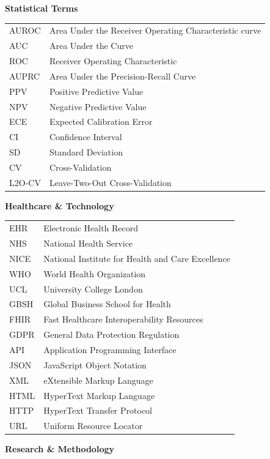 \documentclass[12pt, a4paper]{article}
\begin{document}
\vspace{0.5cm}
\textbf{Statistical Terms}

\begin{tabular}{ll}
AUROC & Area Under the Receiver Operating Characteristic curve \\
AUC & Area Under the Curve \\
ROC & Receiver Operating Characteristic \\
AUPRC & Area Under the Precision-Recall Curve \\
PPV & Positive Predictive Value \\
NPV & Negative Predictive Value \\
ECE & Expected Calibration Error \\
CI & Confidence Interval \\
SD & Standard Deviation \\
CV & Cross-Validation \\
L2O-CV & Leave-Two-Out Cross-Validation \\
\end{tabular}

\vspace{0.5cm}
\textbf{Healthcare \& Technology}

\begin{tabular}{ll}
EHR & Electronic Health Record \\
NHS & National Health Service \\
NICE & National Institute for Health and Care Excellence \\
WHO & World Health Organization \\
UCL & University College London \\
GBSH & Global Business School for Health \\
FHIR & Fast Healthcare Interoperability Resources \\
GDPR & General Data Protection Regulation \\
API & Application Programming Interface \\
JSON & JavaScript Object Notation \\
XML & eXtensible Markup Language \\
HTML & HyperText Markup Language \\
HTTP & HyperText Transfer Protocol \\
URL & Uniform Resource Locator \\
\end{tabular}

\vspace{0.5cm}
\textbf{Research \& Methodology}
\end{document}
